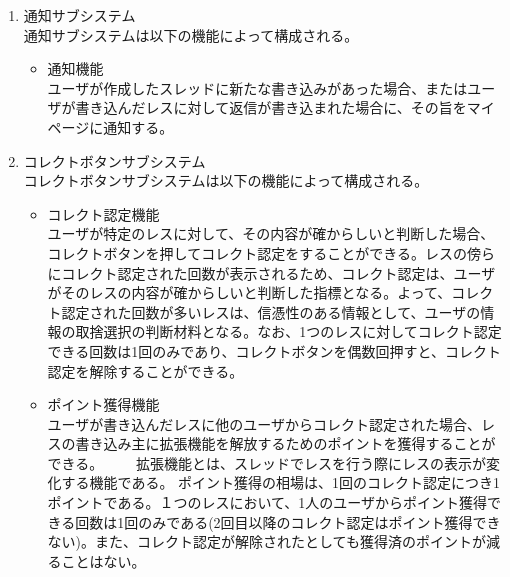 \documentclass[a4j]{jarticle}
\begin{document}
\begin{enumerate}
  \item 通知サブシステム\\
  通知サブシステムは以下の機能によって構成される。
  \begin{itemize}
    \item 通知機能\\
    ユーザが作成したスレッドに新たな書き込みがあった場合、またはユーザが書き込んだレスに対して返信が書き込まれた場合に、その旨をマイページに通知する。
  \end{itemize}

  \item コレクトボタンサブシステム\\
  コレクトボタンサブシステムは以下の機能によって構成される。
  \begin{itemize}
    \item コレクト認定機能\\
    ユーザが特定のレスに対して、その内容が確からしいと判断した場合、コレクトボタンを押してコレクト認定をすることができる。レスの傍らにコレクト認定された回数が表示されるため、コレクト認定は、ユーザがそのレスの内容が確からしいと判断した指標となる。よって、コレクト認定された回数が多いレスは、信憑性のある情報として、ユーザの情報の取捨選択の判断材料となる。なお、1つのレスに対してコレクト認定できる回数は1回のみであり、コレクトボタンを偶数回押すと、コレクト認定を解除することができる。
    \item ポイント獲得機能\\
    ユーザが書き込んだレスに他のユーザからコレクト認定された場合、レスの書き込み主に拡張機能を解放するためのポイントを獲得することができる。
　　拡張機能とは、スレッドでレスを行う際にレスの表示が変化する機能である。
    ポイント獲得の相場は、1回のコレクト認定につき1ポイントである。１つのレスにおいて、1人のユーザからポイント獲得できる回数は1回のみである(2回目以降のコレクト認定はポイント獲得できない)。また、コレクト認定が解除されたとしても獲得済のポイントが減ることはない。
  \end{itemize}


\end{enumerate}
\end{document}
